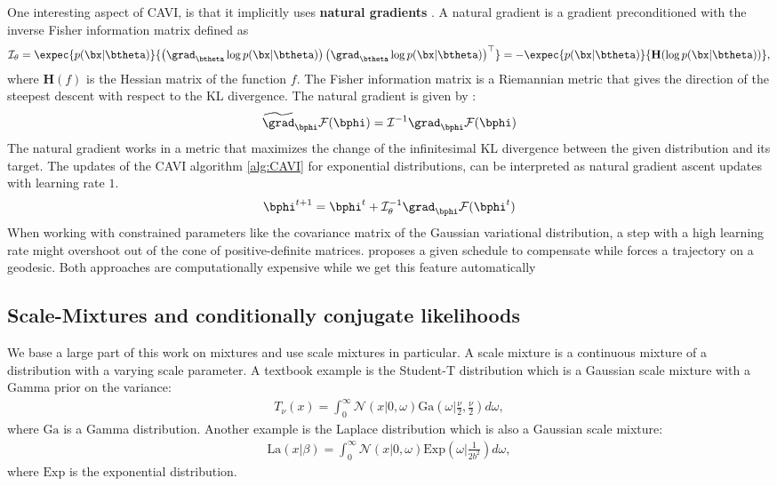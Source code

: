 One interesting aspect of \ac{CAVI}, is that it implicitly uses \textbf{natural gradients} \cite{amariNaturalGradientWorks1998}.
A natural gradient is a gradient preconditioned with the inverse Fisher information matrix defined as
\begin{align}
    \mathcal{I}_\theta = \expec{p(\bx|\btheta)}{\left(\grad_{\btheta}\log p(\bx|\btheta)\right)\left(\grad_{\btheta} \log p(\bx|\btheta)\right)^\top} = -\expec{p(\bx|\btheta)}{\mathbf{H}(\log p(\bx|\btheta))},
    \label{eq:fisherinfomatrix}
\end{align}
where $\mathbf{H}(f)$ is the Hessian matrix of the function $f$.
The Fisher information matrix is a Riemannian metric that gives the direction of the steepest descent with respect to the \ac{KL} divergence.
The natural gradient is given by :
\begin{align*}
    \widetilde{\grad}_{\bphi}\mathcal{F}(\bphi) = \mathcal{I}^{-1} \grad_{\bphi}\mathcal{F}(\bphi)
\end{align*}
The natural gradient works in a metric that maximizes the change of the infinitesimal \ac{KL} divergence between the given distribution and its target\cite{salimbeniNaturalGradientsPractice2018}.
The updates of the \ac{CAVI} algorithm \ref{alg:CAVI} for exponential distributions, can be interpreted as natural gradient ascent updates with learning rate $1$.
\begin{align*}
    \bphi^{t+1} = \bphi^t + \mathcal{I}^{-1}_\theta\grad_{\bphi}\mathcal{F}(\bphi^t)
\end{align*}
When working with constrained parameters like the covariance matrix of the Gaussian variational distribution, a step with a high learning rate might overshoot out of the cone of positive-definite matrices.
\citet{salimbeniNaturalGradientsPractice2018} proposes a given schedule to compensate while \citet{linHandlingPositiveDefiniteConstraint2020} forces a trajectory on a geodesic.
Both approaches are computationally expensive while we get this feature automatically 

\subsection{Scale-Mixtures and conditionally conjugate likelihoods}
\label{sec:scale-mixtures}
We base a large part of this work on mixtures and use scale mixtures in particular.
A scale mixture is a continuous mixture of a distribution with a varying scale parameter.
A textbook example is the Student-T distribution which is a Gaussian scale mixture with a Gamma prior on the variance:
\begin{align*}
    T_\nu(x) = \int_{0}^\infty \mathcal{N}\left(x|0,\omega\right)\mathrm{Ga}\left(\omega|\frac{\nu}{2}, \frac{\nu}{2}\right)d\omega,
\end{align*}
where $\mathrm{Ga}$ is a Gamma distribution.
Another example is the Laplace distribution which is also a Gaussian scale mixture:
\begin{align*}
    \mathrm{La}(x|\beta) = \int_0^{\infty} \mathcal{N}(x|0,\omega)\mathrm{Exp}\left(\omega|\frac{1}{2b^2}\right)d\omega,
\end{align*}
where $\mathrm{Exp}$ is the exponential distribution.


